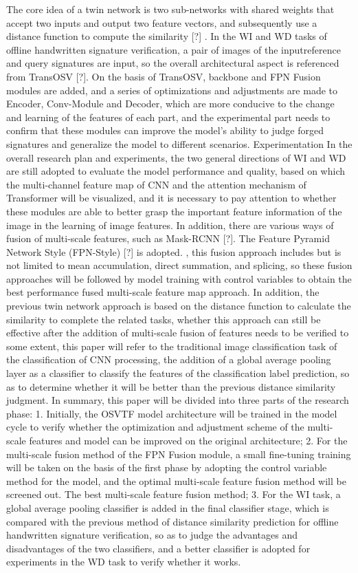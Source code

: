 The core idea of a twin network is two sub-networks with shared weights that accept two inputs and output two feature vectors, and subsequently use a distance function to compute the similarity [?] . In the WI and WD tasks of offline handwritten signature verification, a pair of images of the inputreference and query signatures are input, so the overall architectural aspect is referenced from TransOSV [?]. On the basis of TransOSV, backbone and FPN Fusion modules are added, and a series of optimizations and adjustments are made to Encoder, Conv-Module and Decoder, which are more conducive to the change and learning of the features of each part, and the experimental part needs to confirm that these modules can improve the model's ability to judge forged signatures and generalize the model to different scenarios. Experimentation
In the overall research plan and experiments, the two general directions of WI and WD are still adopted to evaluate the model performance and quality, based on which the multi-channel feature map of CNN and the attention mechanism of Transformer will be visualized, and it is necessary to pay attention to whether these modules are able to better grasp the important feature information of the image in the learning of image features. In addition, there are various ways of fusion of multi-scale features, such as Mask-RCNN [?]. The Feature Pyramid Network Style (FPN-Style) [?] is adopted. , this fusion approach includes but is not limited to mean accumulation, direct summation, and splicing, so these fusion approaches will be followed by model training with control variables to obtain the best performance fused multi-scale feature map approach. In addition, the previous twin network approach is based on the distance function to calculate the similarity to complete the related tasks, whether this approach can still be effective after the addition of multi-scale fusion of features needs to be verified to some extent, this paper will refer to the traditional image classification task of the classification of CNN processing, the addition of a global average pooling layer as a classifier to classify the features of the classification label prediction, so as to determine whether it will be better than the previous distance similarity judgment.
In summary, this paper will be divided into three parts of the research phase: 1. Initially, the OSVTF model architecture will be trained in the model cycle to verify whether the optimization and adjustment scheme of the multi-scale features and model can be improved on the original architecture; 2. For the multi-scale fusion method of the FPN Fusion module, a small fine-tuning training will be taken on the basis of the first phase by adopting the control variable method for the model, and the optimal multi-scale feature fusion method will be screened out. The best multi-scale feature fusion method; 3. For the WI task, a global average pooling classifier is added in the final classifier stage, which is compared with the previous method of distance similarity prediction for offline handwritten signature verification, so as to judge the advantages and disadvantages of the two classifiers, and a better classifier is adopted for experiments in the WD task to verify whether it works.



